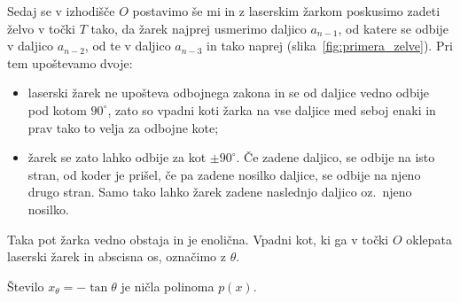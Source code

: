 Sedaj se v izhodišče $O$ postavimo še mi in z laserskim žarkom poskusimo zadeti želvo v točki $T$ tako, da žarek najprej usmerimo daljico $a_{n-1}$, od katere se odbije v daljico $a_{n-2}$, od te v daljico $a_{n-3}$ in tako naprej (slika~\ref{fig:primera_zelve}). Pri tem upoštevamo dvoje:
\begin{itemize}
    \item laserski žarek ne upošteva odbojnega zakona in se od daljice vedno odbije pod kotom $90^\circ$, zato so vpadni koti žarka na vse daljice med seboj enaki in prav tako to velja za odbojne kote;
    \item žarek se zato lahko odbije za kot $\pm 90^\circ$. Če zadene daljico, se odbije na isto stran, od koder je prišel, če pa zadene nosilko daljice, se odbije na njeno drugo stran. Samo tako lahko žarek zadene naslednjo daljico oz.\ njeno nosilko.
\end{itemize}
Taka pot žarka vedno obstaja in je enolična. Vpadni kot, ki ga v točki $O$ oklepata laserski žarek in abscisna os, označimo z $\theta$.

\begin{trditev}
    Število $x_{\theta} = - \tan \theta$ je ničla polinoma $p(x)$.
\end{trditev}

